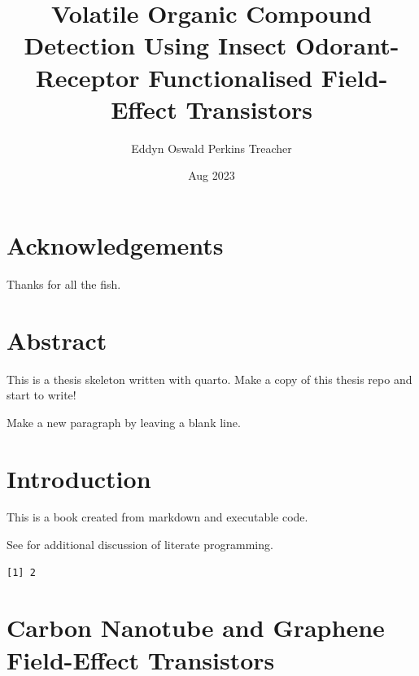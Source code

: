 \documentclass[
  a4paper,
]{scrbook}
\title{Volatile Organic Compound Detection Using Insect Odorant-Receptor
Functionalised Field-Effect Transistors}
\author{Eddyn Oswald Perkins Treacher}
\date{Aug 2023}
\begin{document}
\frontmatter
\maketitle
\ifdefined\Shaded\renewenvironment{Shaded}{\begin{tcolorbox}[interior hidden, boxrule=0pt, sharp corners, frame hidden, breakable, enhanced, borderline west={3pt}{0pt}{shadecolor}]}{\end{tcolorbox}}\fi

\mainmatter
{}

\hypertarget{acknowledgements}{%
\chapter*{Acknowledgements}\label{acknowledgements}}


Thanks for all the fish.


\hypertarget{abstract}{%
\chapter*{Abstract}\label{abstract}}


This is a thesis skeleton written with quarto. Make a copy of this
thesis repo and start to write!

Make a new paragraph by leaving a blank line.

\newpage
\tableofcontents


\hypertarget{introduction}{%
\chapter{Introduction}\label{introduction}}

This is a book created from markdown and executable code.

See for additional discussion of literate programming.

\begin{verbatim}
[1] 2
\end{verbatim}


\hypertarget{carbon-nanotube-and-graphene-field-effect-transistors}{%
\chapter{Carbon Nanotube and Graphene Field-Effect
Transistors}\label{carbon-nanotube-and-graphene-field-effect-transistors}}
\end{document}
